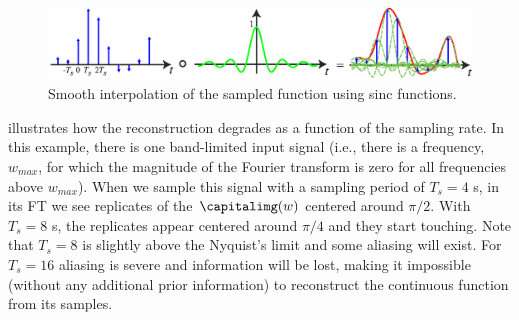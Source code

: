 \begin{figure}[h]
\centerline{
\includegraphics[width=1\linewidth]{figures/Image_processing_sampling/sampling_reconstruction2.eps}
}
\caption{Smooth interpolation of the sampled function using sinc functions.}
\label{fig:sampling_reconstruction2}
\end{figure}






\Fig{\ref{fig:alias1d}} illustrates how the reconstruction degrades as a function of the sampling rate. In this example, there is one band-limited input signal (i.e., there is a frequency, $w_{max}$, for which the magnitude of the Fourier transform is zero for all frequencies above $w_{max}$). When we sample this signal with a sampling period of $T_s = 4$ s, in its FT we see replicates of the $\capitalimg(w)$ centered around $\pi/2$. With $T_s=8$ s, the replicates appear centered around $\pi/4$ and they start touching. Note that $T_s=8$ is slightly above the Nyquist's limit and some aliasing will exist. For $T_s=16$ aliasing is severe and information will be lost, making it impossible (without any additional prior information) to reconstruct the continuous function from its samples. 



